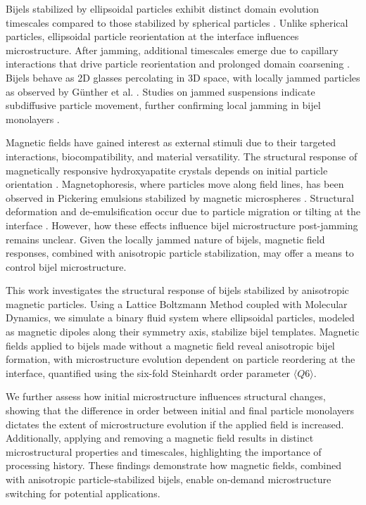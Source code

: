 Bijels stabilized by ellipsoidal particles exhibit distinct domain evolution timescales compared to those stabilized by 
spherical particles \cite{gunther_timescales_2014}. Unlike spherical particles, ellipsoidal particle reorientation at the 
interface influences microstructure. After jamming, additional timescales emerge due to capillary interactions that drive 
particle reorientation and prolonged domain coarsening \cite{gunther_timescales_2014}. Bijels behave as 2D glasses percolating 
in 3D space, with locally jammed particles as observed by Günther et al. 
\cite{ching_bijel_2022, torquato_jammed_2010, gunther_timescales_2014}. Studies on jammed suspensions indicate subdiffusive 
particle movement, further confirming local jamming in bijel monolayers \cite{savelev_diffusion_2006}.

Magnetic fields have gained interest as external stimuli due to their targeted interactions, biocompatibility, and material 
versatility. The structural response of magnetically responsive hydroxyapatite crystals depends on initial particle orientation
\cite{nakayama_stimuli-responsive_2018}. Magnetophoresis, where particles move along field lines, has been observed in Pickering 
emulsions stabilized by magnetic microspheres \cite{tham_magnetophoresis_2021}. Structural deformation and de-emulsification occur due 
to particle migration or tilting at the interface \cite{yang_rapid_2020, misra_magnetic_2020}. However, how these effects influence 
bijel microstructure post-jamming remains unclear. Given the locally jammed nature of bijels, magnetic field responses, combined with 
anisotropic particle stabilization, may offer a means to control bijel microstructure.

This work investigates the structural response of bijels stabilized by anisotropic magnetic particles. Using a Lattice Boltzmann Method 
coupled with Molecular Dynamics, we simulate a binary fluid system where ellipsoidal particles, modeled as magnetic dipoles along their 
symmetry axis, stabilize bijel templates. Magnetic fields applied to bijels made without a magnetic field reveal anisotropic bijel formation, 
with microstructure evolution dependent on particle reordering at the interface, quantified using the six-fold 
Steinhardt order parameter $\langle Q6 \rangle$.

We further assess how initial microstructure influences structural changes, showing that the difference in order between initial and final 
particle monolayers dictates the extent of microstructure evolution if the applied field is increased. Additionally, applying and removing a 
magnetic field results in distinct microstructural properties and timescales, highlighting the importance of processing history. These findings 
demonstrate how magnetic fields, combined with anisotropic particle-stabilized bijels, enable on-demand microstructure switching for potential applications.

